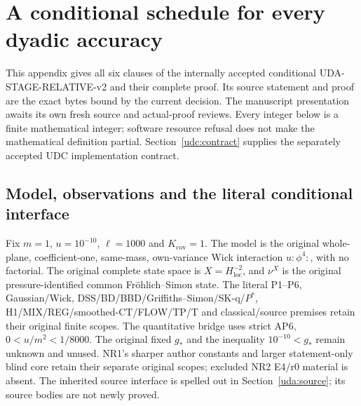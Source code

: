 \clearpage
\begingroup
\normalsize
\renewcommand{\theHequation}{uda.\arabic{equation}}
\section{A conditional schedule for every dyadic accuracy}
\label{uda:current}
This appendix gives all six clauses of the internally accepted conditional
UDA-STAGE-RELATIVE-v2 and their complete proof. Its source statement and proof
are the exact bytes bound by the current decision. The manuscript presentation
awaits its own fresh source and actual-proof reviews. Every integer below is a
finite mathematical integer; software resource refusal does not make the
mathematical definition partial. Section~\ref{udc:contract} supplies the separately
accepted UDC implementation contract.

\subsection{Model, observations and the literal conditional interface}
Fix $m=1$, $u=10^{-10}$, $\ell=1000$ and $K_{\mathrm{cov}}=1$.
The model is the original whole-plane, coefficient-one, same-mass,
own-variance Wick interaction $u{:}\phi^4{:}$, with no factorial.
The original complete state space is $X=H^{-2}_{\mathrm{loc}}$, and
$\nu^X$ is the original pressure-identified common Fr\"ohlich--Simon state.
The literal P1--P6, Gaussian/Wick, DSS/BD/BBD/Griffiths--Simon/SK-q/$P^*$,
H1/MIX/REG/smoothed-CT/FLOW/TP/T and classical/source premises retain their
original finite scopes. The quantitative bridge uses strict AP6,
$0<u/m^2<1/8000$. The original fixed $g_*$ and the inequality
$10^{-10}<g_*$ remain unknown and unused. NR1's sharper author constants and
larger statement-only blind core retain their separate original scopes;
excluded NR2 E4/r0 material is absent. The inherited source interface is
spelled out in Section~\ref{uda:source}; its source bodies are not newly proved.

